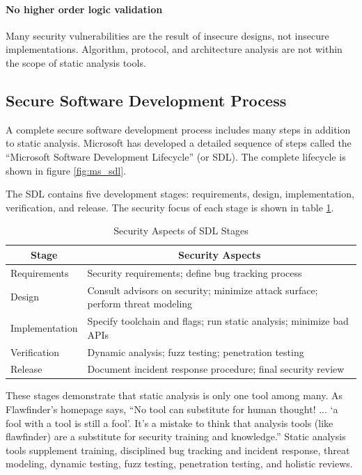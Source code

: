 \documentclass[journal]{IEEEtran}
\newcommand*{\thead}[1]{\multicolumn{1}{c}{\bfseries #1}}
\begin{document}
\paragraph{No higher order logic validation} Many security vulnerabilities are the result of
insecure designs, not insecure implementations. Algorithm, protocol, and architecture analysis are
not within the scope of static analysis tools.

\subsection{Secure Software Development Process}

A complete secure software development process includes many steps in addition to static analysis.
Microsoft has developed a detailed sequence of steps called the ``Microsoft Software Development
Lifecycle'' (or SDL). The complete lifecycle is shown in figure \ref{fig:ms_sdl}.

The SDL contains five development stages: requirements, design, implementation, verification, and
release. The security focus of each stage is shown in table \ref{table:sdl_security}.

\begin{table}[h]
    \centering
    \begin{tabular}{|l|p{}|}
        \hline
        \thead{Stage} & \thead{Security Aspects} \\ \hline
        Requirements &
            Security requirements; define bug tracking process
            \\ \hline
        Design &
            Consult advisors on security; minimize attack surface; perform threat modeling
            \\ \hline
        Implementation &
            Specify toolchain and flags; run static analysis; minimize bad APIs
            \\ \hline
        Verification &
            Dynamic analysis; fuzz testing; penetration testing
            \\ \hline
        Release &
            Document incident response procedure; final security review
            \\ \hline
    \end{tabular}
    \caption{Security Aspects of SDL Stages}
    \label{table:sdl_security}
\end{table}

These stages demonstrate that static analysis is only one tool among many. As Flawfinder's homepage
says, ``No tool can substitute for human thought! ... `a fool with a tool is still a fool'. It’s a
mistake to think that analysis tools (like flawfinder) are a substitute for security training and
knowledge.'' Static analysis tools supplement training, disciplined bug tracking and incident
response, threat modeling, dynamic testing, fuzz testing, penetration testing, and holistic reviews.
\end{document}
